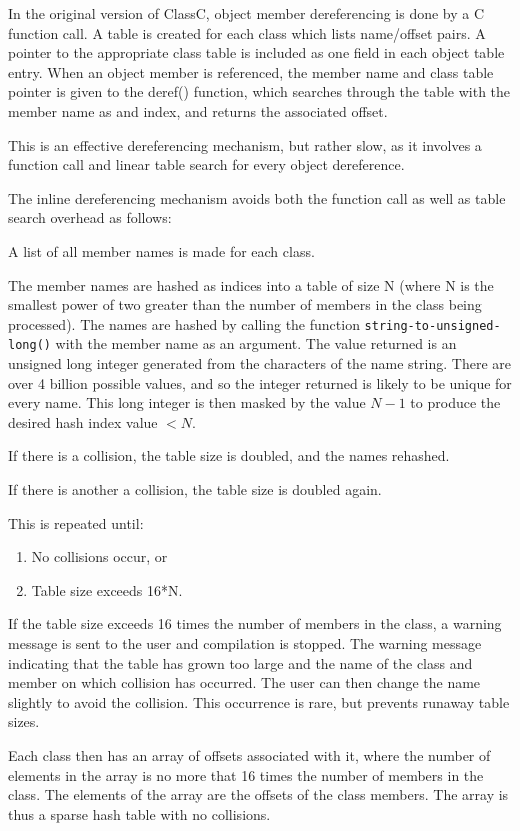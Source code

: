 In the original version of ClassC, object member dereferencing is done
by a C function call.  A table is created for each class which 
lists name/offset pairs.  A pointer to the appropriate class table
is included as one field in each object table entry.  When an object
member is referenced, the member name and class table pointer is
given to the deref() function, which searches through the table with
the member name as and index, and returns the associated offset.

This is an effective dereferencing mechanism, but rather slow, as it
involves a function call and linear table search for every object
dereference.

The inline dereferencing mechanism avoids both the function call 
as well as table search overhead as follows:

A list of all member names is made for each class.

The member names are hashed as indices into a table of size N
(where N is the smallest power of two greater than the number of
members in the class being processed).  The names are hashed by
calling the function {\tt string-to-unsigned-long()} with the member
name as an argument.  The value returned is an unsigned long
integer generated from the characters of the name string.  There are
over 4 billion possible values, and so the integer returned is
likely to be unique for every name.
This long integer is then masked by the value $N-1$ to produce
the desired hash index value $< N$.

If there is a collision, the table size is doubled, and the names rehashed.

If there is another a collision, the table size is doubled again.

This is repeated until:
\begin{enumerate}
\item No collisions occur, or
\item Table size exceeds 16*N.
\end{enumerate}

If the table size exceeds 16 times the number of members in the class, a
warning message is sent to the user and compilation is stopped.
The warning message indicating that the table has grown
too large and the name of the class and member on which collision has
occurred.  The user can then change the name slightly to avoid the collision.
This occurrence is rare, but prevents runaway table sizes.

Each class then has an array of offsets associated with it, where the
number of elements in the array is no more that 16 times the number of
members in the class.  The elements of the array are the offsets of
the class members.  The array is thus a sparse hash table with no
collisions.

